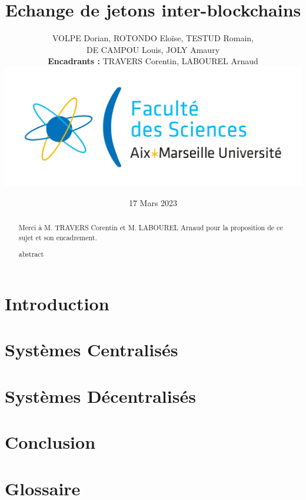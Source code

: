 \documentclass{article}
\newenvironment*{remerciements}{%
  \renewcommand*{\abstractname}{Remerciements}
  \begin{abstract}
}{
  \end{abstract}
}
\begin{document}
\title{Echange de jetons inter-blockchains}
\author{VOLPE Dorian, ROTONDO Eloïse, TESTUD Romain,\\DE CAMPOU Louis, JOLY Amaury  \\ \textbf{Encadrants :} TRAVERS Corentin, LABOUREL Arnaud \\ \includegraphics[scale=0.1]{./img/amu.png}}
\date{17 Mars 2023}

\begin{titlepage}
  \maketitle
\end{titlepage}

\begin{remerciements}
  Merci à M. TRAVERS Corentin et M. LABOUREL Arnaud pour la proposition de ce sujet et son encadrement.
\end{remerciements}
\begin{abstract}
  abstract
\end{abstract}

\newpage

\tableofcontents

\newpage

\section{Introduction}

\section{Systèmes Centralisés}

\section{Systèmes Décentralisés}

\section{Conclusion}

\section{Glossaire}

\end{document}
